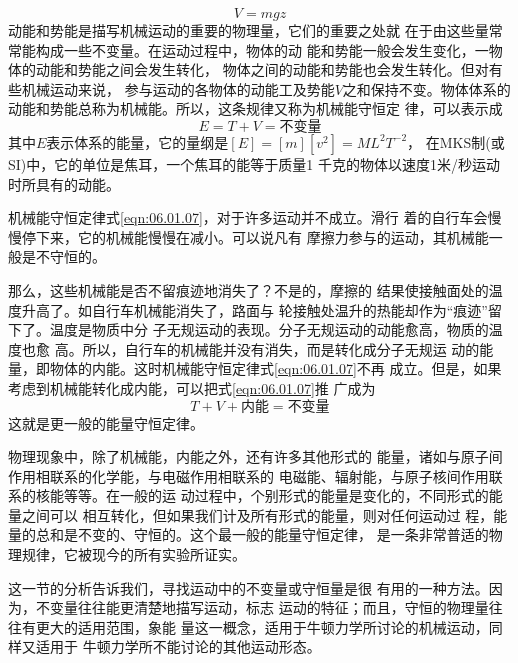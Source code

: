 \begin{equation*}
 V = m g z
\end{equation*}
动能和势能是描写机械运动的重要的物理量，它们的重要之处就
在于由这些量常常能构成一些不变量。在运动过程中，物体的动
能和势能一般会发生变化，一物体的动能和势能之间会发生转化，
物体之间的动能和势能也会发生转化。但对有些机械运动来说，
参与运动的各物体的动能工及势能$ V $之和保持不变。物体体系的
动能和势能总称为机械能。所以，这条规律又称为机械能守恒定
律，可以表示成
\begin{equation}\label{eqn:06.01.07}
 E = T + V = \text{不变量}
\end{equation}
其中$ E $表示体系的能量，它的量纲是$ [ E ] = [ m ][ v ^ { 2 } ] = M L ^ { 2 } T ^ { - 2 } $，
在MKS制(或SI)中，它的单位是焦耳，一个焦耳的能等于质量1
千克的物体以速度1米/秒运动时所具有的动能。

机械能守恒定律\lhbrak 式\eqref{eqn:06.01.07}\rhbrak ，对于许多运动并不成立。滑行
着的自行车会慢慢停下来，它的机械能慢慢在减小。可以说凡有
摩擦力参与的运动，其机械能一般是不守恒的。

那么，这些机械能是否不留痕迹地消失了？不是的，摩擦的
结果使接触面处的温度升高了。如自行车机械能消失了，路面与
轮接触处温升的热能却作为“痕迹”留下了。温度是物质中分
子无规运动的表现。分子无规运动的动能愈高，物质的温度也愈
高。所以，自行车的机械能并没有消失，而是转化成分子无规运
动的能量，即物体的内能。这时机械能守恒定律\lhbrak 式\eqref{eqn:06.01.07}\rhbrak 不再
成立。但是，如果考虑到机械能转化成内能，可以把式\eqref{eqn:06.01.07}推
广成为
\begin{equation*}
 T + V + \text{内能} = \text{不变量}
\end{equation*}
这就是更一般的能量守恒定律。

物理现象中，除了机械能，内能之外，还有许多其他形式的
能量，诸如与原子间作用相联系的化学能，与电磁作用相联系的
电磁能、辐射能，与原子核间作用联系的核能等等。在一般的运
动过程中，个别形式的能量是变化的，不同形式的能量之间可以
相互转化，但如果我们计及所有形式的能量，则对任何运动过
程，能量的总和是不变的、守恒的。这个最一般的能量守恒定律，
是一条非常普适的物理规律，它被现今的所有实验所证实。

这一节的分析告诉我们，寻找运动中的不变量或守恒量是很
有用的一种方法。因为，不变量往往能更清楚地描写运动，标志
运动的特征；而且，守恒的物理量往往有更大的适用范围，象能
量这一概念，适用于牛顿力学所讨论的机械运动，同样又适用于
牛顿力学所不能讨论的其他运动形态。